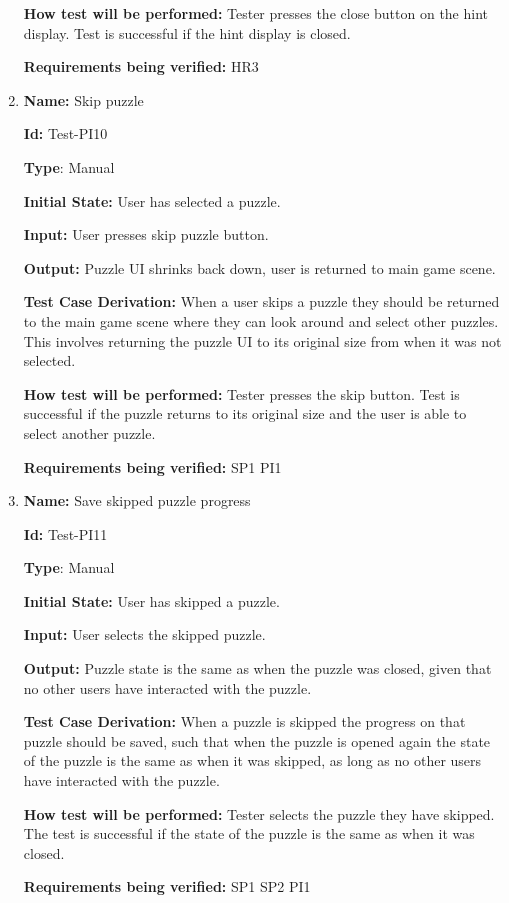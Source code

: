 \documentclass[12pt, titlepage]{article}
\begin{document}
\begin{enumerate}
\textbf{How test will be performed:}
Tester presses the close button on the hint display. Test is successful if the hint display is closed.

\textbf{Requirements being verified: } HR3

\item{\textbf{Name:} Skip puzzle}

\textbf{Id:} Test-PI10

\textbf{Type}: Manual

\textbf{Initial State:} User has selected a puzzle.

\textbf{Input:} User presses skip puzzle button.

\textbf{Output:} Puzzle UI shrinks back down, user is returned to main game scene.

\textbf{Test Case Derivation:}
When a user skips a puzzle they should be returned to the main game scene where they can look around and select other puzzles. This involves returning the puzzle UI to its original size from when it was not selected.

\textbf{How test will be performed:}
Tester presses the skip button. Test is successful if the puzzle returns to its original size and the user is able to select another puzzle.

\textbf{Requirements being verified: } SP1 PI1

\item{\textbf{Name:} Save skipped puzzle progress}

\textbf{Id:} Test-PI11

\textbf{Type}: Manual

\textbf{Initial State:} User has skipped a puzzle.

\textbf{Input:} User selects the skipped puzzle.

\textbf{Output:} Puzzle state is the same as when the puzzle was closed, given that no other users have interacted with the puzzle.

\textbf{Test Case Derivation:}
When a puzzle is skipped the progress on that puzzle should be saved, such that when the puzzle is opened again the state of the puzzle is the same as when it was skipped, as long as no other users have interacted with the puzzle.

\textbf{How test will be performed:}
Tester selects the puzzle they have skipped. The test is successful if the state of the puzzle is the same as when it was closed.

\textbf{Requirements being verified: } SP1 SP2 PI1


\end{enumerate}
\end{document}
